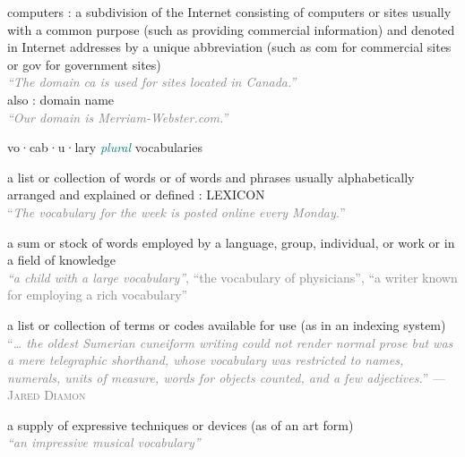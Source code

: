 \documentclass[a4paper, DIV=13, BCOR=0cm]{scrbook}
\begin{document}
\begin{mdframed}
{\begin{compactenum}
				\item computers : a subdivision of the Internet consisting of computers or sites usually with a common purpose (such as providing commercial information) and denoted in Internet addresses by a unique abbreviation (such as com for commercial sites or gov for government sites) \\
				\textcolor{gray}{\textit{\enquote{The domain ca is used for sites located in Canada.}}} \\
				also : domain name \\
				\textcolor{gray}{\textit{\enquote{Our domain is Merriam-Webster.com.}}}
		\end{compactenum}
	}
\end{mdframed}

\begin{mdframed}[%
	linewidth=1pt,%
	frametitlerule=true,%
	frametitlebackgroundcolor=gray!20,%
	innertopmargin=\topskip,%
	frametitlefont=\normalfont,%
	frametitle={{\textbf{vocabulary}} {\scriptsize\textsc{noun \hfill Merriam-Webster}}}%
	]
	
	{\small vo·​cab·​u·​lary \textit{\textcolor{teal}{plural}} vocabularies
		\begin{compactenum}
			\item a list or collection of words or of words and phrases usually alphabetically arranged and explained or defined : LEXICON \\
			\textcolor{gray}{\enquote{\textit{The vocabulary for the week is posted online every Monday.}}}
			\item
			\begin{compactenum}
				\item a sum or stock of words employed by a language, group, individual, or work or in a field of knowledge \\
				\textcolor{gray}{\textit{\enquote{a child with a large vocabulary}}, \enquote{the vocabulary of physicians}, \enquote{a writer known for employing a rich vocabulary}}
				\item a list or collection of terms or codes available for use (as in an indexing system) \\
				\textcolor{gray}{\enquote{\textit{… the oldest Sumerian cuneiform writing could not render normal prose but was a mere telegraphic shorthand, whose vocabulary was restricted to names, numerals, units of measure, words for objects counted, and a few adjectives.}} --- \textsc{Jared Diamon}}
			\end{compactenum}
			\item a supply of expressive techniques or devices (as of an art form) \\
			\textcolor{gray}{\textit{\enquote{an impressive musical vocabulary}}}
		\end{compactenum}
	}
\end{mdframed}
\end{document}
